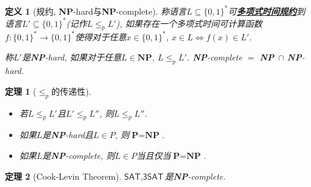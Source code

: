 \documentclass[8pt]{article}
\theoremstyle{compact}
\newtheorem{theorem}{定理}
\newtheorem{definition}{定义}
\def\obj#1{\textbf{\uline{#1}}}
\def\le{\leqslant}
\def\P{\textbf{P}}
\def\NP{\textbf{NP}}
\begin{document}
\begin{definition}[规约, \NP-hard与\NP-complete]
	称语言$L \subseteq \{0, 1\}^*$可\obj{多项式时间规约}到语言$L' \subseteq \{0, 1\}^*$(记作$L \le_p L'$), 如果存在一个多项式时间可计算函数$f: \{0, 1\}^* \to \{0, 1\}^*$使得对于任意$x \in \{0, 1\}^*$, $x \in L \Leftrightarrow f(x) \in L'$. 

	称$L'$是\NP-hard, 如果对于任意$L \in \NP$, $L \le_p L'$. \NP-complete $=$ \NP\ $\cap$ \NP-hard.  
\end{definition}
\begin{theorem}[$\le_p$的传递性]
	\begin{itemize}
		\item 若$L \le_p L'$且$L' \le_p L''$, 则$L \le_p L''$. 
		\item 如果$L$是\NP-hard且$L \in P$, 则$\P = \NP$. 
		\item 如果$L$是\NP-complete, 则$L \in P$当且仅当$\P = \NP$. 
	\end{itemize}
\end{theorem}
\begin{theorem}[Cook-Levin Theorem]
	$\textsf{SAT}, \textsf{3SAT}$是\NP-complete. 
\end{theorem}

\newpage
\end{document}
